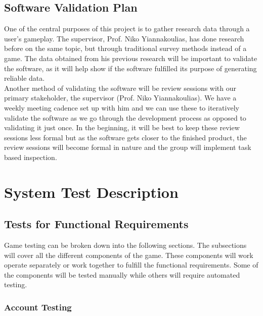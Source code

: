 \documentclass[12pt, titlepage]{article}
\begin{document}
\subsection{Software Validation Plan}


  One of the central purposes of this project is to gather research data through a user's gameplay. The supervisor, Prof. Niko Yiannakoulias, has done research before on the same topic, but through traditional survey methods instead of a game. The data obtained from his previous research will be important to validate the software, as it will help show if the software fulfilled its purpose of generating reliable data.
  \\ 

Another method of validating the software will be review sessions with our primary stakeholder, the supervisor (Prof. Niko Yiannakoulias). We have a weekly meeting cadence set up with him and we can use these to iteratively validate the software as we go through the development process as opposed to validating it just once. In the beginning, it will be best to keep these review sessions less formal but as the software gets closer to the finished product, the review sessions will become formal in nature and the group will implement task based inspection.

\section{System Test Description}
	
\subsection{Tests for Functional Requirements}

Game testing can be broken down into the following sections. The subsections will cover all the different components of the game. These components will work operate separately or work together to fulfill the functional requirements. Some of the components will be tested manually while others will require automated testing.


\subsubsection{Account Testing}
\end{document}
